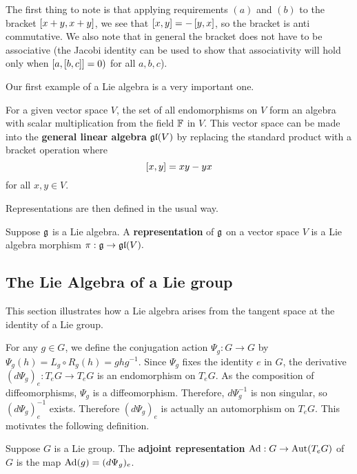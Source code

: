 \documentclass[a4paper]{article}
\begin{document}
The first thing to note is that applying requirements $(a)$ and $(b)$ to the bracket $\left[ x + y, x + y \right]$, we see that $\left[ x, y \right] = -\left[ y, x \right]$, so the bracket is anti commutative. We also note that in general the bracket does not have to be associative (the Jacobi identity can be used to show that associativity will hold only when $\left[ a, \left[ b,c \right] \right] = 0)$ for all $a, b, c$).

Our first example of a Lie algebra is a very important one.

\begin{defi}
    For a given vector space $V$, the set of all endomorphisms on $V$ form an algebra with scalar multiplication from the field $\mathbb{F}$ in $V$. This vector space can be made into the \textbf{general linear algebra} $\mathfrak{gl}(V)$ by replacing the standard product with a bracket operation where 
    $$\left[ x, y \right] = xy - yx$$
    for all $x, y \in V$.
\end{defi}

Representations are then defined in the usual way. 

\begin{defi}
    Suppose $\mathfrak{g}$ is a Lie algebra. A \textbf{representation} of $\mathfrak{g}$ on a vector space $V$ is a Lie algebra morphism 
    $\pi : \mathfrak{g} \to \mathfrak{gl}(V).$
\end{defi}

\subsection{The Lie Algebra of a Lie group}
This section illustrates how a Lie algebra arises from the tangent space at the identity of a Lie group.

For any $g \in G$, we define the conjugation action $\Psi_g: G \to G$ by $\Psi_g(h) = L_g \circ R_g (h) = ghg^{-1}$.  Since $\Psi_g$ fixes the identity $e$ in $G$, the derivative $(d\Psi_g)_e : T_e G \to T_e G$ is an endomorphism on $T_e G$. As the composition of diffeomorphisms, $\Psi_g$ is a diffeomorphism. Therefore, $d\Psi_g^{-1}$ is non singular, so $(d\Psi_g)^{-1}_e$ exists. Therefore $(d\Psi_g)_e$ is actually an automorphism on $T_e G$. This motivates the following definition.

\begin{defi}
    Suppose $G$ is a Lie group. The \textbf{adjoint representation} $\operatorname{Ad}: G \to \operatorname{Aut}(T_e G)$ of $G$ is the map $\operatorname{Ad}(g) = (d\Psi_g)_e$.
\end{defi}
\end{document}
